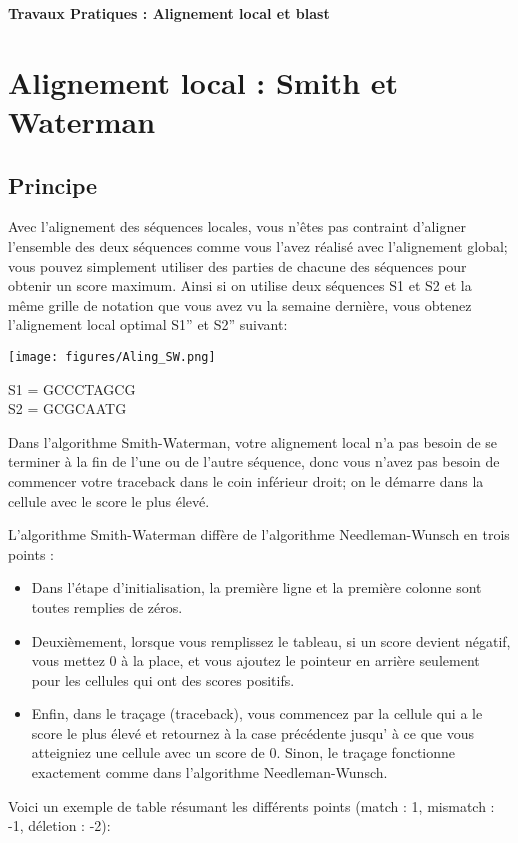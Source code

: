 \documentclass{article}
\begin{document}
  \centering        
    \vfill
    
       {\LARGE \textbf{Travaux Pratiques : Alignement local et blast}} \\[1in]
    
    \justifying
    \section{Alignement local : Smith et Waterman }
	\renewcommand{\thepage}{\arabic{page}}
	\setcounter{page}{1}
    \subsection{Principe}
Avec l'alignement des séquences locales, vous n'êtes pas contraint d'aligner l'ensemble des deux séquences comme vous l'avez réalisé avec l'alignement global; vous pouvez simplement utiliser des parties de chacune des séquences pour obtenir un score maximum. Ainsi si on utilise deux séquences S1 et S2 et la même grille de notation que vous avez vu la semaine dernière, vous obtenez l'alignement local optimal S1'' et S2'' suivant:

\begin{center}
\texttt{[image: figures/Aling\_SW.png]}
\end{center}
S1 = GCCCTAGCG\\
S2 = GCGCAATG

Dans l'algorithme Smith-Waterman, votre alignement local n'a pas besoin de se terminer à la fin de l'une ou de l'autre séquence, donc vous n'avez pas besoin de commencer votre traceback dans le coin inférieur droit; on le démarre dans la cellule avec le score le plus élevé.
\medbreak

L'algorithme Smith-Waterman diffère de l'algorithme Needleman-Wunsch en trois points :
\begin{itemize}
\item Dans l'étape d'initialisation, la première ligne et la première colonne sont toutes remplies de zéros. 
\item Deuxièmement, lorsque vous remplissez le tableau, si un score devient négatif, vous mettez 0 à la place, et vous ajoutez le pointeur en arrière seulement pour les cellules qui ont des scores positifs.
\item Enfin, dans le traçage (traceback), vous commencez par la cellule qui a le score le plus élevé et retournez à la case précédente jusqu' à ce que vous atteigniez une cellule avec un score de 0. Sinon, le traçage fonctionne exactement comme dans l'algorithme Needleman-Wunsch.
\end{itemize}	
\newpage
Voici un exemple de table résumant les différents points (match : 1, mismatch : -1, déletion : -2):
\end{document}
